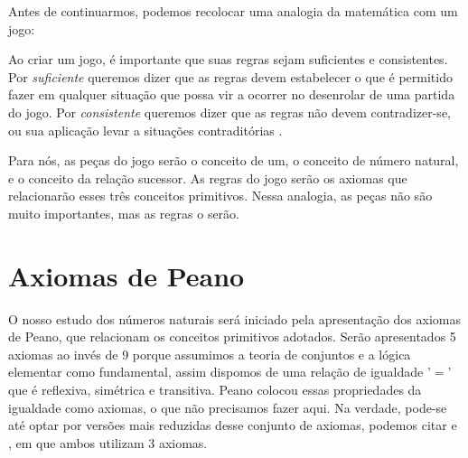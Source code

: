 \documentclass[../main.tex]{subfiles}
\begin{document}
Antes de continuarmos, podemos recolocar uma analogia da matemática com um jogo:

\begin{displayquote} Ao criar um jogo, é importante que suas regras sejam suficientes e consistentes. Por \emph{suficiente} queremos dizer que as regras devem estabelecer o que é permitido fazer em qualquer situação que possa vir a ocorrer no desenrolar de uma partida do jogo. Por \emph{consistente} queremos dizer que as regras não devem contradizer-se, ou sua aplicação levar a situações contraditórias \Parencite[p. 13-14]{barbosa}.
\end{displayquote}

Para nós, as peças do jogo serão o conceito de um, o conceito de número natural, e o conceito da relação sucessor. As regras do jogo serão os axiomas que relacionarão esses três conceitos primitivos. Nessa analogia, as peças não são muito importantes, mas as regras o serão.

\section{Axiomas de Peano}
O nosso estudo dos números naturais será iniciado pela apresentação dos axiomas de Peano, que relacionam os conceitos primitivos adotados. Serão apresentados 5 axiomas ao invés de 9 porque assumimos a teoria de conjuntos e a lógica elementar como fundamental, assim dispomos de uma relação de igualdade '$=$' que é reflexiva, simétrica e transitiva. Peano colocou essas propriedades da igualdade como axiomas, o que não precisamos fazer aqui. Na verdade, pode-se até optar por versões mais reduzidas desse conjunto de axiomas, podemos citar \textcite{ferreira} e \textcite{lima-analise-1}, em que ambos utilizam 3 axiomas.
\end{document}

